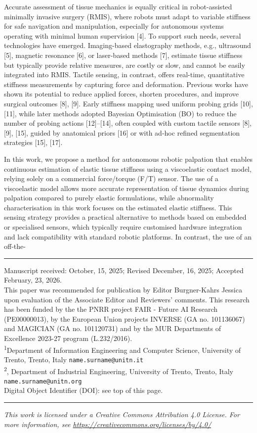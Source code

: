 \documentclass[11pt]{article}
\begin{document}
Accurate assessment of tissue mechanics is equally critical in
robot-assisted minimally invasive surgery (RMIS), where robots must
adapt to variable stiffness for safe navigation and manipulation,
especially for autonomous systems operating with minimal human
supervision [4]. To support such needs, several technologies have
emerged. Imaging-based elastography methods, e.g., ultrasound [5],
magnetic resonance [6], or laser-based methods [7], estimate tissue
stiffness but typically provide relative measures, are costly or slow,
and cannot be easily integrated into RMIS. Tactile sensing, in
contrast, offers real-time, quantitative stiffness measurements by
capturing force and deformation. Previous works have shown its
potential to reduce applied forces, shorten procedures, and improve
surgical outcomes [8], [9]. Early stiffness mapping used uniform
probing grids [10], [11], while later methods adopted Bayesian
Optimisation (BO) to reduce the number of probing actions [12]--[14],
often coupled with custom tactile sensors [8], [9], [15], guided by
anatomical priors [16] or with ad-hoc refined segmentation strategies
[15], [17].

In this work, we propose a method for autonomous robotic palpation
that enables continuous estimation of elastic tissue stiffness using a
viscoelastic contact model, relying solely on a commercial
force/torque (F/T) sensor. The use of a viscoelastic model allows more
accurate representation of tissue dynamics during palpation compared
to purely elastic formulations, while abnormality characterisation in
this work focuses on the estimated elastic stiffness. This sensing
strategy provides a practical alternative to methods based on embedded
or specialised sensors, which typically require customised hardware
integration and lack compatibility with standard robotic platforms. In
contrast, the use of an off-the-

\vfill
\hrule
\vspace{0.4em}
\noindent
{\footnotesize
Manuscript received: October, 15, 2025; Revised December, 16, 2025;
Accepted February, 23, 2026.\\[2pt]
This paper was recommended for publication by Editor Burgner-Kahrs
Jessica upon evaluation of the Associate Editor and Reviewers'
comments. This research has been funded by the the PNRR project FAIR
- Future AI Research (PE00000013), by the European Union projects
INVERSE (GA no. 101136067) and MAGICIAN (GA no. 101120731) and by the
MUR Departments of Excellence 2023-27 program (L.232/2016).\\[2pt]
\textsuperscript{1}Department of Information Engineering and Computer
Science, University of Trento, Trento, Italy
\texttt{name.surname@unitn.it}\\[2pt]
\textsuperscript{2}, Department of Industrial Engineering, University
of Trento, Trento, Italy \texttt{name.surname@unitn.org}\\[2pt]
Digital Object Identifier (DOI): see top of this page.\par}

\vspace{0.4em}
\hrule
\vspace{0.3em}

\begin{center}
{\footnotesize\itshape
This work is licensed under a Creative Commons Attribution 4.0
License. For more information, see
\url{https://creativecommons.org/licenses/by/4.0/}\par}
\end{center}
\end{document}
